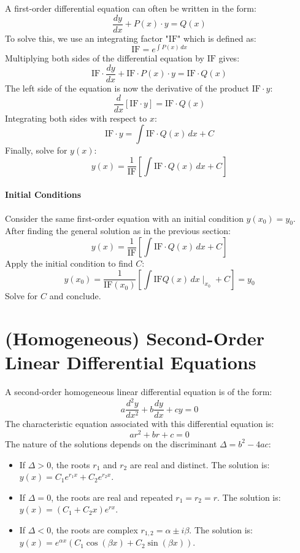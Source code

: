 \documentclass[]{article}
\begin{document}
	A first-order differential equation can often be written in the form:
	$$
	\frac{dy}{dx} + P(x) \cdot y = Q(x)
	$$
	To solve this, we use an integrating factor "$\text{IF}$" which is defined as:
	$$
	\text{IF} = e^{\int P(x) \, dx}
	$$
	Multiplying both sides of the differential equation by $\text{IF}$ gives:
	$$
	\text{IF} \cdot \frac{dy}{dx} + \text{IF} \cdot P(x) \cdot y = \text{IF} \cdot Q(x)
	$$
	The left side of the equation is now the derivative of the product $\text{IF} \cdot y$:
	$$
	\frac{d}{dx}\left[\text{IF} \cdot y\right] = \text{IF} \cdot Q(x)
	$$
	Integrating both sides with respect to $x$:
	$$
	\text{IF} \cdot y = \int \text{IF} \cdot Q(x) \, dx + C
	$$
	Finally, solve for $y(x)$:
	$$
	y(x) = \frac{1}{\text{IF}}\left[\int \text{IF} \cdot Q(x) \, dx + C\right]
	$$
	
	\paragraph{Initial Conditions}
	
	Consider the same first-order equation with an initial condition $y(x_0) = y_0$.
	After finding the general solution as in the previous section:
	$$
	y(x) = \frac{1}{\text{IF}}\left[\int \text{IF} \cdot Q(x) \, dx + C\right]
	$$
	Apply the initial condition to find $C$:
	$$
	y(x_0) = \frac{1}{\text{IF}(x_0)}\left[\int \text{IF}Q(x) \, dx \mid_{x_0} + C\right] = y_0
	$$
	Solve for $C$ and conclude.
	
	\section{(Homogeneous) Second-Order Linear Differential Equations}
	
	A second-order homogeneous linear differential equation is of the form:
	$$
	a\frac{d^2y}{dx^2} + b\frac{dy}{dx} + cy = 0
	$$
	The characteristic equation associated with this differential equation is:
	$$
	ar^2 + br + c = 0
	$$
	The nature of the solutions depends on the discriminant $\Delta = b^2 - 4ac$:
	\begin{itemize}
		\item If $\Delta > 0$, the roots $r_1$ and $r_2$ are real and distinct.
		The solution is: $y(x) = C_1e^{r_1x} + C_2e^{r_2x}$.
		\item If $\Delta = 0$, the roots are real and repeated $r_1 = r_2 = r$.
		The solution is: $y(x) = (C_1 + C_2x)e^{rx}$.
		\item If $\Delta < 0$, the roots are complex $r_{1,2} = \alpha \pm i\beta$.
		The solution is: $y(x) = e^{\alpha x}(C_1\cos(\beta x) + C_2\sin(\beta x))$.
	\end{itemize}
	
\end{document}
